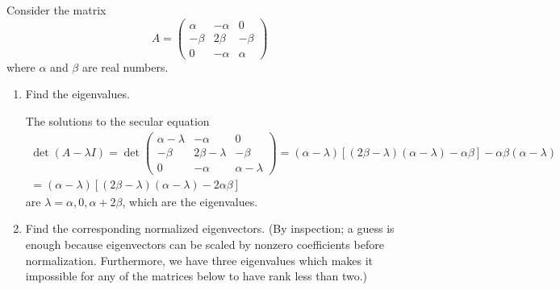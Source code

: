 \documentclass[11pt]{article}
\newcommand{\sbr}[1]{\left[#1\right]}
\begin{document}
Consider the matrix 
\[A = \begin{pmatrix}
    \alpha & - \alpha & 0 \\
    -\beta & 2\beta & -\beta \\
    0 & -\alpha & \alpha
\end{pmatrix}\]
where $\alpha$ and $\beta$ are real numbers.
\begin{enumerate}[label=(\alph*)]
    \item Find the eigenvalues.
    
    The solutions to the secular equation 
    \begin{multline*}
        \det(A-\lambda I) = \det\begin{pmatrix}
            \alpha-\lambda & - \alpha & 0 \\
        -\beta & 2\beta-\lambda & -\beta \\
        0 & -\alpha & \alpha-\lambda
        \end{pmatrix} = (\alpha-\lambda)\sbr{(2\beta-\lambda)(\alpha-\lambda)-\alpha\beta} - \alpha\beta(\alpha-\lambda) \\
        = (\alpha-\lambda)\sbr{(2\beta-\lambda)(\alpha-\lambda)-2\alpha\beta}
    \end{multline*}
    are $\lambda = \alpha, 0, \alpha+2\beta$, which are the eigenvalues.
    \item Find the corresponding normalized eigenvectors. (By inspection; a guess is enough because eigenvectors can be scaled by nonzero coefficients before normalization. Furthermore, we have three eigenvalues which makes it impossible for any of the matrices below to have rank less than two.)
    

\end{enumerate}
\end{document}
